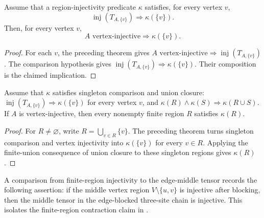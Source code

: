 \begin{theorem}%
    \label{thm:peps_singletonRegionInjectivityFromVertexInjectivity}
    \leanok
    Assume that a region-injectivity predicate $\kappa$ satisfies, for every
    vertex $v$,
    \[
        \operatorname{inj}(T_{A,\{v\}})\Longrightarrow\kappa(\{v\}).
    \]
    Then, for every vertex $v$,
    \[
        A\text{ vertex-injective}\Longrightarrow\kappa(\{v\}).
    \]
\end{theorem}
\begin{proof}\leanok
    For each $v$, the preceding theorem gives
    $A\text{ vertex-injective}\Longrightarrow
        \operatorname{inj}(T_{A,\{v\}})$. The comparison hypothesis gives
    $\operatorname{inj}(T_{A,\{v\}})\Longrightarrow\kappa(\{v\})$. Their
    composition is the claimed implication.
\end{proof}

\begin{theorem}%
    \label{thm:peps_finiteRegionInjectivityFromSingletons}
    \leanok
    Assume that $\kappa$ satisfies singleton comparison and union closure:
    $\operatorname{inj}(T_{A,\{v\}})\Longrightarrow\kappa(\{v\})$ for every
    vertex $v$, and
    $\kappa(R)\wedge\kappa(S)\Longrightarrow\kappa(R\cup S)$. If $A$ is
    vertex-injective, then every nonempty finite region $R$ satisfies
    $\kappa(R)$.
\end{theorem}
\begin{proof}\leanok
    For $R\ne\varnothing$, write $R=\bigcup_{v\in R}\{v\}$. The preceding
    theorem turns singleton comparison and vertex injectivity into
    $\kappa(\{v\})$ for every $v\in R$. Applying the finite-union consequence
    of union closure to these singleton regions gives $\kappa(R)$.
\end{proof}

\begin{definition}%
    \label{def:peps_edgeMiddleRegionInjectivityComparison}
    \leanok
    A comparison from finite-region injectivity to the edge-middle tensor
    records the following assertion: if the middle vertex region
    $V\setminus\{u,v\}$ is injective after blocking, then the middle tensor
    in the edge-blocked three-site chain is injective. This isolates the
    finite-region contraction claim in
    \cite[Section~3]{Molnar2018NormalPEPS}.
\end{definition}

